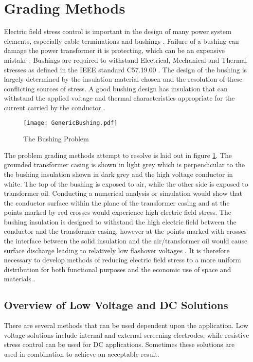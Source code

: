 \section{Grading Methods} \label{s:method}
Electric field stress control is important in the design of many power system elements, especially cable terminations and bushings \cite{james2008condition}.
Failure of a bushing can damage the power transformer it is protecting, which can be an expensive mistake \cite{warne2005newnes}.
Bushings are required to withstand Electrical, Mechanical and Thermal stresses as defined in the IEEE standard C57.19.00 \cite{1440990}.
The design of the bushing is largely determined by the insulation material chosen and the resolution of these conflicting sources of stress.
A good bushing design has insulation that can withstand the applied voltage and thermal characteristics appropriate for the current carried by the conductor \cite{harlow2004electric}.

\begin{figure}[!h]
   \centering
   \texttt{[image: GenericBushing.pdf]}
   \caption{The Bushing Problem}
   \label{figure:problem}
\end{figure}

The problem grading methods attempt to resolve is laid out in figure \ref{figure:problem}.
The grounded transformer casing is shown in light grey which is perpendicular to the the bushing insulation shown in dark grey and the high voltage conductor in white.
The top of the bushing is exposed to air, while the other side is exposed to transformer oil.
Conducting a numerical analysis or simulation would show that the conductor surface within the plane of the transformer casing and at the points marked by red crosses would experience high electric field stress.
The bushing insulation is designed to withstand the high electric field between the conductor and the transformer casing, however at the points marked with crosses the interface between the solid insulation and the air/transformer oil would cause surface discharge leading to relatively low flashover voltages \cite{kuffel2000high}.
It is therefore necessary to develop methods of reducing electric field stress to a more uniform distribution for both functional purposes and the economic use of space and materials \cite{james2008condition}.

\subsection{Overview of Low Voltage and DC Solutions}
There are several methods that can be used dependent upon the application.
Low voltage solutions include internal and external screening electrodes, while resistive stress control can be used for DC applications. Sometimes these solutions are used in combination to achieve an acceptable result.


